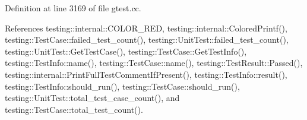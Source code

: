 Definition at line 3169 of file gtest.\+cc.



References testing\+::internal\+::\+C\+O\+L\+O\+R\+\_\+\+R\+ED, testing\+::internal\+::\+Colored\+Printf(), testing\+::\+Test\+Case\+::failed\+\_\+test\+\_\+count(), testing\+::\+Unit\+Test\+::failed\+\_\+test\+\_\+count(), testing\+::\+Unit\+Test\+::\+Get\+Test\+Case(), testing\+::\+Test\+Case\+::\+Get\+Test\+Info(), testing\+::\+Test\+Info\+::name(), testing\+::\+Test\+Case\+::name(), testing\+::\+Test\+Result\+::\+Passed(), testing\+::internal\+::\+Print\+Full\+Test\+Comment\+If\+Present(), testing\+::\+Test\+Info\+::result(), testing\+::\+Test\+Info\+::should\+\_\+run(), testing\+::\+Test\+Case\+::should\+\_\+run(), testing\+::\+Unit\+Test\+::total\+\_\+test\+\_\+case\+\_\+count(), and testing\+::\+Test\+Case\+::total\+\_\+test\+\_\+count().


